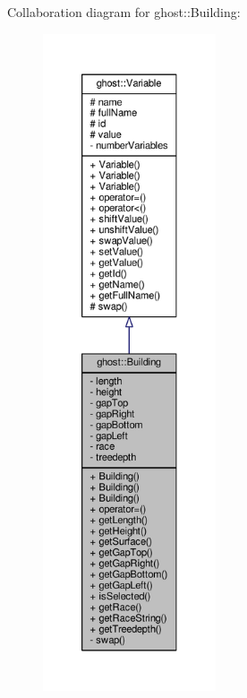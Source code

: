 Collaboration diagram for ghost\-:\-:Building\-:\nopagebreak
\begin{figure}[H]
\begin{center}
\leavevmode
\includegraphics[height=550pt]{classghost_1_1Building__coll__graph}
\end{center}
\end{figure}
